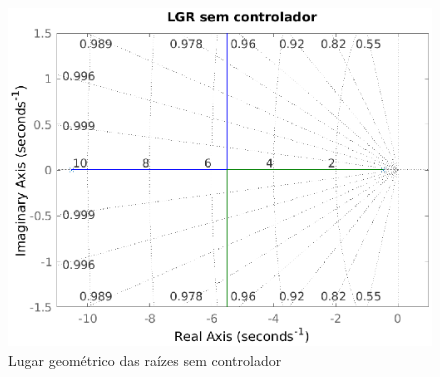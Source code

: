     \begin{figure}[!ht]
        \centering
        \includegraphics[width = 0.75\linewidth]{Figuras/ProblemasPI/Problema2/LGRsemcontrolador.eps}
        \caption{Lugar geométrico das raízes sem controlador}
        \label{fig:LGR2Bsem}                   
    \end{figure}

